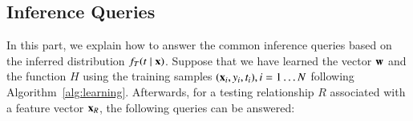 

\subsection{Inference Queries}
In this part, we explain how to answer the common inference queries based on the inferred distribution $f_T(t\mid \mathbf{x})$. Suppose that we have learned the vector ${\mathbf{w}}$ and the function ${H}$ using the training samples $(\mathbf{x}_i, y_i, t_i), i=1\dots N$ following Algorithm~\ref{alg:learning}. Afterwards, for a testing relationship $R$ associated with a feature vector $\mathbf{x}_R$, the following queries can be answered:\\


